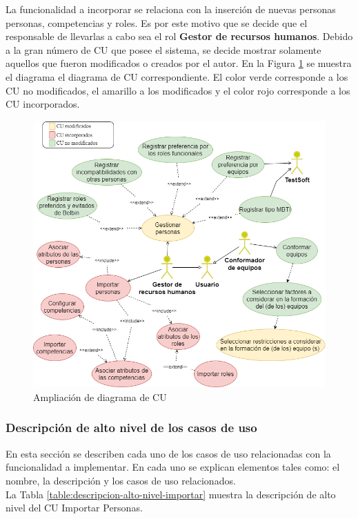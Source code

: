 La funcionalidad a incorporar se relaciona con la inserción de nuevas personas personas, competencias y roles. Es por este motivo que se decide que el responsable de llevarlas a cabo sea el rol \textbf{Gestor de recursos humanos}. Debido a la gran número de CU que posee el sistema, se decide mostrar solamente aquellos que fueron modificados o creados por el autor. En la Figura \ref{fig:CU_nuevo} se muestra el diagrama el diagrama de CU correspondiente. El color verde corresponde a los CU no modificados, el amarillo a los modificados y el color rojo corresponde a los CU incorporados.

\begin{figure}[H]
	\centering
	\includegraphics[width=\textwidth]{figuras/diagrama_CUTeamSoftImportar.png}
	\caption{Ampliación de diagrama de CU} \label{fig:CU_nuevo}
\end{figure}

\subsubsection{Descripción de alto nivel de los casos de uso}
En esta sección se describen cada uno de los casos de uso relacionadas con la funcionalidad a implementar. En cada uno se explican elementos tales como: el nombre, la descripción y los casos de uso relacionados.\\

La Tabla \ref{table:descripcion-alto-nivel-importar} muestra la descripción de alto nivel del CU Importar Personas.

